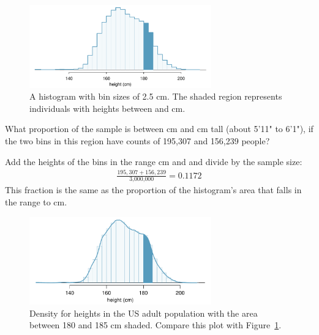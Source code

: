 \begin{figure}[h!]
	\centering
	\includegraphics[width=0.7\textwidth]{ch_probability_oi_biostat/figures/usHeightsHist180185/usHeightsHist180185}
	\caption{A histogram with bin sizes of 2.5 cm. The shaded region represents individuals with heights between  and  cm. }
	\label{usHeightsHist180185}
\end{figure}

\begin{example}{What proportion of the sample is between  cm and  cm tall (about 5'11" to 6'1"), if the two bins in this region have counts of 195,307 and 156,239 people?}\label{contDistProb}
	
Add the heights of the bins in the range  cm and  and divide by the sample size:
	\begin{align*}
		\frac{195,307+156,239}{\text{3,000,000}} = 0.1172
	\end{align*}
	This fraction is the same as the proportion of the histogram's area that falls in the range  to  cm.
\end{example}

\begin{figure}
	\centering
	\includegraphics[width=0.7\textwidth]{ch_probability_oi_biostat/figures/fdicHeightContDistFilled/fdicHeightContDistFilled}
	\caption{Density for heights in the US adult population with the area between 180 and 185 cm shaded. Compare this plot with Figure~\ref{usHeightsHist180185}.}
	\label{fdicHeightContDistFilled}
\end{figure}

